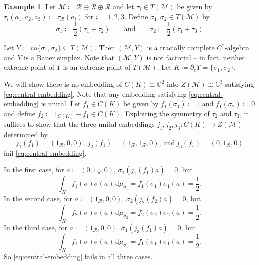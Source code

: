 \documentclass[a4paper,11pt]{amsart}
\theoremstyle{definition}
\newtheorem{example}[theorem]{Example}
\numberwithin{equation}{section}
\numberwithin{theorem}{section}
\newcommand{\R}{\mathcal R}
\newcommand{\M}{\mathcal{M}}
\begin{document}
\begin{example}\label{eg:nonbundle}
Let $\M\coloneqq \R \oplus \R \oplus \R$ and let $\tau_i \in T(\M)$ be given by $\tau_i(a_1, a_2, a_3) \coloneqq \tau_\R(a_i)$ for $i = 1, 2, 3$.  Define $\sigma_1, \sigma_2 \in T(\mathcal M)$ by
\begin{equation}
	\sigma_1 \coloneqq \frac12 (\tau_1 + \tau_2) \qquad \text{and} \qquad \sigma_2 \coloneqq \frac12(\tau_1 + \tau_3)
\end{equation}

Let $Y\coloneqq\mathrm{co}\{\sigma_1, \sigma_2\} \subseteq T(\M)$.  Then $(\M, Y)$ is a tracially complete $C^*$-algebra and $Y$ is a Bauer simplex.  Note that $(\M,Y)$ is not factorial -- in fact, neither extreme point of $Y$ is an extreme point of $T(\M)$.  Let $K \coloneqq \partial_e Y = \{\sigma_1,\sigma_2 \}$.

We will show there is no embedding of $C(K) \cong \mathbb C^2$ into $Z(\M) \cong \mathbb C^3$ satisfying \eqref{eq:central-embedding}.  Note that any embedding satisfying \eqref{eq:central-embedding} is unital.  Let $f_1 \in C(K)$ be given by $f_1(\sigma_1) \coloneqq 1$ and $f_1(\sigma_2) \coloneqq 0$ and define $f_2 \coloneqq 1_{C(K)} - f_1 \in C(K)$.   Exploiting the symmetry of $\tau_2$ and $\tau_3$, it suffices to show that the three unital embeddings $j_1, j_2, j_3 \colon C(K) \rightarrow Z(\M)$ determined by
\begin{equation}
	j_1(f_1) = (1_\mathcal R, 0, 0),\ j_2(f_1) = (1_\mathcal R, 1_\mathcal R, 0),\ \text{and}\ j_3(f_1) = (0, 1_\mathcal R, 0)
\end{equation}
fail \eqref{eq:central-embedding}.

In the first case, for $a \coloneqq (0, 1_\mathcal R, 0)$, $\sigma_1(j_1(f_1) a) = 0$, but 
\begin{equation}
	\int_K f_1(\sigma)\sigma(a) \, \mathrm{d}\mu_{\sigma_1} = f_1(\sigma_1)\sigma_1(a) = \frac12.
\end{equation}
In the second case, for $a \coloneqq (1_\mathcal R, 0, 0)$, $\sigma_2(j_2(f_2)a) = 0$, but 
\begin{equation}
 	\int_K f_2(\sigma)\sigma(a) \, \mathrm{d}\mu_{\sigma_2} = f_2(\sigma_2)\sigma_2(a) = \frac12.
\end{equation}
In the third case, for $a \coloneqq (1_\R, 0, 0)$, $\sigma_1(j_3(f_1)a) = 0$, but 
\begin{equation}
	\int_K f_1(\sigma)\sigma(a) \, \mathrm{d}\mu_{\sigma_1} = f_1(\sigma_1)\sigma_1(a) = \frac12.
\end{equation}
So \eqref{eq:central-embedding} fails in all three cases.
\end{example}
\end{document}
